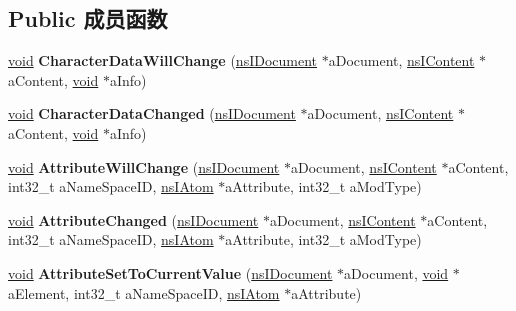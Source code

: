 \subsection*{Public 成员函数}
\begin{DoxyCompactItemize}
\item 
\mbox{\label{interfacens_i_mutation_observer_a624f2e46d585bc4db57dd93a1e010d17}} 
\hyperlink{interfacevoid}{void} {\bfseries Character\+Data\+Will\+Change} (\hyperlink{interfacens_i_document}{ns\+I\+Document} $\ast$a\+Document, \hyperlink{interfacens_i_content}{ns\+I\+Content} $\ast$a\+Content, \hyperlink{interfacevoid}{void} $\ast$a\+Info)
\item 
\mbox{\label{interfacens_i_mutation_observer_aa80df129d2c87ff1a4f526ef6991fe89}} 
\hyperlink{interfacevoid}{void} {\bfseries Character\+Data\+Changed} (\hyperlink{interfacens_i_document}{ns\+I\+Document} $\ast$a\+Document, \hyperlink{interfacens_i_content}{ns\+I\+Content} $\ast$a\+Content, \hyperlink{interfacevoid}{void} $\ast$a\+Info)
\item 
\mbox{\label{interfacens_i_mutation_observer_a1366e3b5edc3438345b9a35e222c04fe}} 
\hyperlink{interfacevoid}{void} {\bfseries Attribute\+Will\+Change} (\hyperlink{interfacens_i_document}{ns\+I\+Document} $\ast$a\+Document, \hyperlink{interfacens_i_content}{ns\+I\+Content} $\ast$a\+Content, int32\+\_\+t a\+Name\+Space\+ID, \hyperlink{interfacens_i_supports}{ns\+I\+Atom} $\ast$a\+Attribute, int32\+\_\+t a\+Mod\+Type)
\item 
\mbox{\label{interfacens_i_mutation_observer_a9074a9d54da14b6cfcd818d2fe597204}} 
\hyperlink{interfacevoid}{void} {\bfseries Attribute\+Changed} (\hyperlink{interfacens_i_document}{ns\+I\+Document} $\ast$a\+Document, \hyperlink{interfacens_i_content}{ns\+I\+Content} $\ast$a\+Content, int32\+\_\+t a\+Name\+Space\+ID, \hyperlink{interfacens_i_supports}{ns\+I\+Atom} $\ast$a\+Attribute, int32\+\_\+t a\+Mod\+Type)
\item 
\mbox{\label{interfacens_i_mutation_observer_a2ae72c4834d7a4b61c8df0dc5c076163}} 
\hyperlink{interfacevoid}{void} {\bfseries Attribute\+Set\+To\+Current\+Value} (\hyperlink{interfacens_i_document}{ns\+I\+Document} $\ast$a\+Document, \hyperlink{interfacevoid}{void} $\ast$a\+Element, int32\+\_\+t a\+Name\+Space\+ID, \hyperlink{interfacens_i_supports}{ns\+I\+Atom} $\ast$a\+Attribute)

\end{DoxyCompactItemize}
